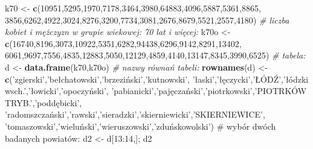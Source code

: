 \documentclass[polish,]{book}
\newenvironment{Shaded}{\begin{snugshade}}{\end{snugshade}}
\newcommand{\CommentTok}[1]{\textcolor[rgb]{0.56,0.35,0.01}{\textit{#1}}}
\newcommand{\DecValTok}[1]{\textcolor[rgb]{0.00,0.00,0.81}{#1}}
\newcommand{\KeywordTok}[1]{\textcolor[rgb]{0.13,0.29,0.53}{\textbf{#1}}}
\newcommand{\NormalTok}[1]{#1}
\newcommand{\StringTok}[1]{\textcolor[rgb]{0.31,0.60,0.02}{#1}}
\begin{document}
\begin{Shaded}
\begin{Highlighting}[]
\NormalTok{k70 <-}\StringTok{ }\KeywordTok{c}\NormalTok{(}\DecValTok{10951}\NormalTok{,}\DecValTok{5295}\NormalTok{,}\DecValTok{1970}\NormalTok{,}\DecValTok{7178}\NormalTok{,}\DecValTok{3464}\NormalTok{,}\DecValTok{3980}\NormalTok{,}\DecValTok{64883}\NormalTok{,}\DecValTok{4096}\NormalTok{,}\DecValTok{5887}\NormalTok{,}\DecValTok{5361}\NormalTok{,}\DecValTok{8865}\NormalTok{,}
\DecValTok{3856}\NormalTok{,}\DecValTok{6262}\NormalTok{,}\DecValTok{4922}\NormalTok{,}\DecValTok{3024}\NormalTok{,}\DecValTok{8276}\NormalTok{,}\DecValTok{3200}\NormalTok{,}\DecValTok{7734}\NormalTok{,}\DecValTok{3081}\NormalTok{,}\DecValTok{2676}\NormalTok{,}\DecValTok{8679}\NormalTok{,}\DecValTok{5521}\NormalTok{,}\DecValTok{2557}\NormalTok{,}\DecValTok{4180}\NormalTok{)}
\CommentTok{# liczba kobiet i mężczyzn w grupie wiekowej: 70 lat i więcej:}
\NormalTok{k70o <-}\StringTok{ }\KeywordTok{c}\NormalTok{(}\DecValTok{16740}\NormalTok{,}\DecValTok{8196}\NormalTok{,}\DecValTok{3073}\NormalTok{,}\DecValTok{10922}\NormalTok{,}\DecValTok{5351}\NormalTok{,}\DecValTok{6282}\NormalTok{,}\DecValTok{94438}\NormalTok{,}\DecValTok{6296}\NormalTok{,}\DecValTok{9142}\NormalTok{,}\DecValTok{8291}\NormalTok{,}\DecValTok{13402}\NormalTok{,}
\DecValTok{6061}\NormalTok{,}\DecValTok{9697}\NormalTok{,}\DecValTok{7556}\NormalTok{,}\DecValTok{4835}\NormalTok{,}\DecValTok{12883}\NormalTok{,}\DecValTok{5050}\NormalTok{,}\DecValTok{12129}\NormalTok{,}\DecValTok{4859}\NormalTok{,}\DecValTok{4140}\NormalTok{,}\DecValTok{13147}\NormalTok{,}\DecValTok{8345}\NormalTok{,}\DecValTok{3990}\NormalTok{,}\DecValTok{6525}\NormalTok{)}
\CommentTok{# tabela:}
\NormalTok{d <-}\StringTok{ }\KeywordTok{data.frame}\NormalTok{(k70,k70o)}
\CommentTok{# nazwy równań tabeli:}
\KeywordTok{rownames}\NormalTok{(d) <-}\StringTok{ }\KeywordTok{c}\NormalTok{(}\StringTok{'zgierski'}\NormalTok{,}\StringTok{'bełchatowski'}\NormalTok{,}\StringTok{'brzeziński'}\NormalTok{,}\StringTok{'kutnowski'}\NormalTok{,}
\StringTok{'łaski'}\NormalTok{,}\StringTok{'łęczycki'}\NormalTok{,}\StringTok{'ŁÓDŹ','}\NormalTok{łódzki wsch.}\StringTok{','}\NormalTok{łowicki}\StringTok{','}\NormalTok{opoczyński}\StringTok{',}
\StringTok{'}\NormalTok{pabianicki}\StringTok{','}\NormalTok{pajęczański}\StringTok{','}\NormalTok{piotrkowski}\StringTok{','}\NormalTok{PIOTRKÓW TRYB.}\StringTok{','}\NormalTok{poddębicki}\StringTok{',}
\StringTok{'}\NormalTok{radomszczański}\StringTok{','}\NormalTok{rawski}\StringTok{','}\NormalTok{sieradzki}\StringTok{','}\NormalTok{skierniewicki}\StringTok{','}\NormalTok{SKIERNIEWICE}\StringTok{',}
\StringTok{'}\NormalTok{tomaszowski}\StringTok{','}\NormalTok{wieluński}\StringTok{','}\NormalTok{wieruszowski}\StringTok{','}\NormalTok{zduńskowolski}\StringTok{')}
\StringTok{# wybór dwóch badanych powiatów:}
\StringTok{d2 <- d[13:14,]; d2}
\end{Highlighting}
\end{Shaded}
\end{document}
